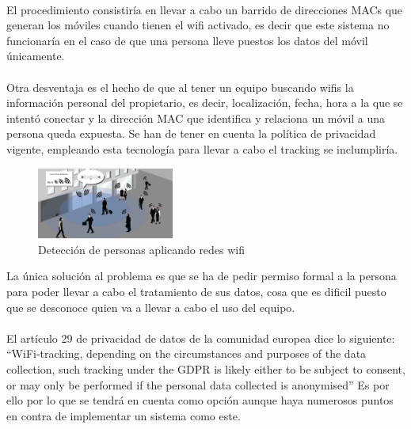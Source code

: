 \documentclass[paper=a4, fontsize=11pt,twoside]{scrartcl}	%
\begin{document}
            \paragraph{}
            El procedimiento consistiría en llevar a cabo un barrido de direcciones MACs que generan los móviles cuando tienen el wifi activado,
            es decir que este sistema no funcionaría en el caso de que una persona lleve puestos los datos del móvil únicamente.
            \paragraph{}
            Otra desventaja es el hecho de que al tener un equipo buscando wifis la información personal del propietario, es decir, localización,
            fecha, hora a la que se intentó conectar y la dirección MAC que identifica y relaciona un móvil a una persona queda expuesta.
            Se han de tener en cuenta la política de privacidad vigente, empleando esta tecnología para llevar a cabo el tracking se inclumpliría.
            \begin{center}
                \begin{figure}[ht]
                    \centering
                    \includegraphics[width=0.4\textwidth]{WifiCounting.jpg}
                    \caption{Detección de personas aplicando redes wifi}
                    \label{fig:mesh1}
                \end{figure}
            \end{center}
            La única solución al problema es que se ha de pedir permiso formal a la persona para poder llevar a cabo
            el tratamiento de sus datos, cosa que es dificil puesto que se desconoce quien va a llevar a cabo el uso del equipo.
            \paragraph{}
            El artículo 29 de privacidad de datos de la comunidad europea dice lo siguiente:
            “WiFi-tracking, depending on the circumstances and purposes of the data collection, such tracking under the GDPR is likely
            either to be subject to consent, or may only be performed if the personal data collected is anonymised”
            Es por ello por lo que  se tendrá en cuenta como opción aunque haya numerosos puntos en contra de implementar un sistema como este.
\end{document}
